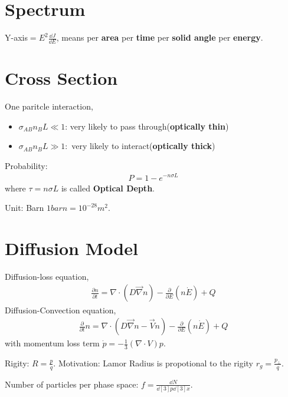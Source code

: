 \documentclass{sciposter}
\begin{document}
\begin{multicols}{3}


\section{Spectrum}

Y-axis$= E^{2}\frac{\dd{J}}{\dd{E}} $, means per \textbf{area} per \textbf{time} per \textbf{solid angle} per \textbf{energy}.
\section{Cross Section}
One paritcle interaction, 
\begin{itemize}
  \item $\sigma_{AB}n_{B}L \ll 1  $: very likely to pass through(\textbf{optically thin})
  \item $\sigma_{AB}n_{B}L \gg 1:  $ very likely to interact(\textbf{optically thick})
\end{itemize}

Probability:
\begin{align}
    P=1-e^{-n\sigma L} 
\end{align}
where $\tau=n\sigma L$ is called \textbf{Optical Depth}.

Unit: Barn $1 barn = 10^{-28}m^{2}  $.




\section{Diffusion Model}

Diffusion-loss equation,
\begin{align}
    \frac{\partial n}{\partial t}=\nabla \cdot \left(D \vec{\nabla}n\right)-\frac{\partial}{\partial E}(n\dot{E})+Q
\end{align}
Diffusion-Convection equation,
\begin{align}
    \frac{\partial}{\partial t}n=\nabla \cdot \left(D\vec{\nabla}n-\vec{V}n\right)-\frac{\partial }{\partial E}(n\dot{E})+Q
\end{align}
with momentum loss term $\dot{p}=-\frac{1}{3}(\nabla \cdot V)p$.

Rigity: $R=\frac{p}{q}$. Motivation: Lamor Radius is propotional to the rigity $r_{g}=\frac{p_{\bot } }{q} $.

Number of particles per phase space: $f=\frac{\dd{N}}{\dd[3]{p}\dd[3]{x}}$.


\end{multicols}
\end{document}
